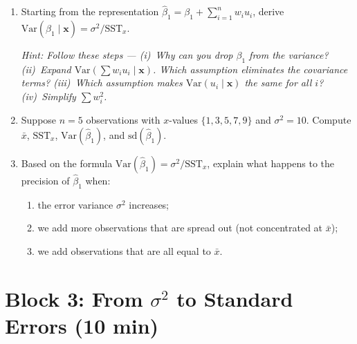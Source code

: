 \documentclass[11pt,a4paper]{article}
\begin{document}
\begin{enumerate}[label=(\alph*)]
\item Starting from the representation $\hat{\beta}_1 = \beta_1 + \sum_{i=1}^{n} w_i u_i$, derive $\text{Var}(\hat{\beta}_1 \mid \mathbf{x}) = \sigma^2/\text{SST}_x$.

\textcolor{hintcolor}{\emph{Hint: Follow these steps --- (i)~Why can you drop $\beta_1$ from the variance? (ii)~Expand $\text{Var}(\sum w_i u_i \mid \mathbf{x})$. Which assumption eliminates the covariance terms? (iii)~Which assumption makes $\text{Var}(u_i \mid \mathbf{x})$ the same for all $i$? (iv)~Simplify $\sum w_i^2$.}}

\begin{answerbox}
\vspace{8cm}
\end{answerbox}

\newpage
\item Suppose $n = 5$ observations with $x$-values $\{1, 3, 5, 7, 9\}$ and $\sigma^2 = 10$. Compute $\bar{x}$, $\text{SST}_x$, $\text{Var}(\hat{\beta}_1)$, and $\text{sd}(\hat{\beta}_1)$.

\begin{answerbox}
\vspace{5cm}
\end{answerbox}

\item Based on the formula $\text{Var}(\hat{\beta}_1) = \sigma^2/\text{SST}_x$, explain what happens to the precision of $\hat{\beta}_1$ when:
\begin{enumerate}[label=(\roman*)]
  \item the error variance $\sigma^2$ increases;
  \item we add more observations that are spread out (not concentrated at $\bar{x}$);
  \item we add observations that are all equal to $\bar{x}$.
\end{enumerate}

\begin{answerbox}
\vspace{5cm}
\end{answerbox}

\end{enumerate}

\section{Block 3: From $\sigma^2$ to Standard Errors \textnormal{(10 min)}}
\end{document}
